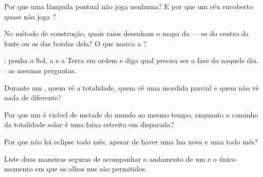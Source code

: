 \begin{exercise}[$\star$]\label{exo:g7:shadows-eclipses:2}
Por que uma lâmpada pontual não joga  nenhuma? E por que um
céu encoberto quase não joga ?
\end{exercise}

\begin{exercise}[$\star$]\label{exo:g7:shadows-eclipses:3}
No método de construção, quais raios desenham o mapa da  --- os
do centro da fonte ou os das bordas dela? O que marca a ?
\end{exercise}

\begin{exercise}[$\star$]\label{exo:g7:shadows-eclipses:4}
: ponha o Sol, a  e a Terra em ordem e diga qual
precisa ser a fase da  naquele dia. : as mesmas
perguntas.
\end{exercise}

\begin{exercise}[$\star$]\label{exo:g7:shadows-eclipses:5}
Durante um , quem vê a totalidade, quem vê uma mordida
parcial e quem não vê nada de diferente?
\end{exercise}

\begin{exercise}[$\star$]\label{exo:g7:shadows-eclipses:6}
Por que um  é visível de metade do mundo ao mesmo tempo,
enquanto o caminho da totalidade solar é uma faixa estreita em
disparada?
\end{exercise}

\begin{exercise}[$\star$]\label{exo:g7:shadows-eclipses:7}
Por que não há eclipse todo mês, apesar de haver uma lua nova e uma
 todo mês?
\end{exercise}

\begin{exercise}[$\star$]\label{exo:g7:shadows-eclipses:8}
Liste duas maneiras seguras de acompanhar o andamento de um  e o único momento em que os olhos nus são permitidos.
\end{exercise}

